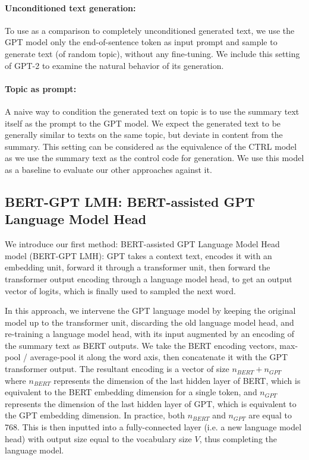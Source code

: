 \documentclass{article}
\begin{document}
\paragraph{Unconditioned text generation:}
To use as a comparison to completely unconditioned generated text, we use the GPT model only the end-of-sentence token as input prompt and sample to generate text (of random topic), without any fine-tuning. We include this setting of GPT-2 to examine the natural behavior of its generation.

\paragraph{Topic as prompt:}
A naive way to condition the generated text on topic is to use the summary text itself as the prompt to the GPT model. We expect the generated text to be generally similar to texts on the same topic, but deviate in content from the summary. This setting can be considered as the equivalence of the CTRL model\cite{ctrl} as we use the summary text as the control code for generation. We use this model as a baseline to evaluate our other approaches against it.

\subsection{BERT-GPT LMH: BERT-assisted GPT Language Model Head}

We introduce our first method: BERT-assisted GPT Language Model Head model (BERT-GPT LMH): GPT takes a context text, encodes it with an embedding unit, forward it through a transformer unit, then forward the transformer output encoding through a language model head, to get an output vector of logits, which is finally used to sampled the next word. 

In this approach, we intervene the GPT language model by keeping the original model up to the transformer unit, discarding the old language model head, and re-training a language model head, with its input augmented by an encoding of the summary text as BERT outputs. We take the BERT encoding vectors, max-pool / average-pool it along the word axis, then concatenate it with the GPT transformer output. The resultant encoding is a vector of size $n_{BERT} + n_{GPT}$ where $n_{BERT}$ represents the dimension of the last hidden layer of BERT, which is equivalent to the BERT embedding dimension for a single token, and $n_{GPT}$ represents the dimension of the last hidden layer of GPT, which is equivalent to the GPT embedding dimension. In practice, both $n_{BERT}$ and $n_{GPT}$ are equal to 768. This is then inputted into a fully-connected layer (i.e. a new language model head) with output size equal to the vocabulary size $V$, thus completing the language model. 
\end{document}
